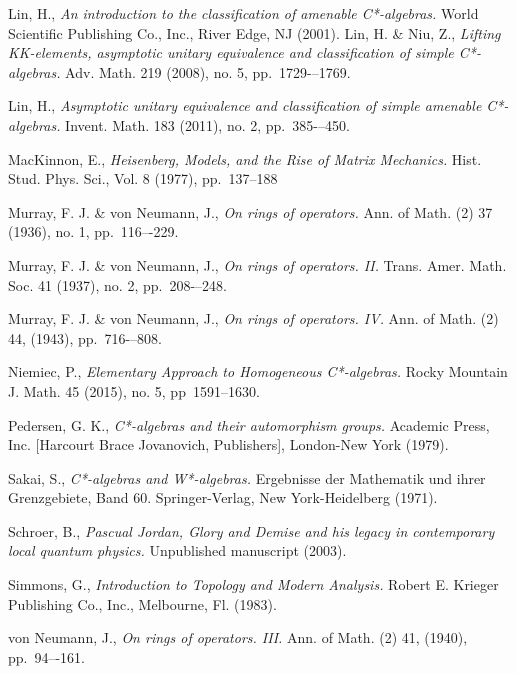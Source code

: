 \documentclass[12pt,a4paper]{amsart}
\theoremstyle{plain}
\theoremstyle{definition}
\begin{document}
\begin{thebibliography}{00}
	Lin, H.,
	\emph{An introduction to the classification of amenable C*-algebras.}
	World Scientific Publishing Co., Inc., River Edge, NJ (2001).
	Lin, H. \& Niu, Z.,
	\emph{Lifting KK-elements, asymptotic unitary equivalence and classification of simple C*-algebras.}
	Adv. Math. 219 (2008), no. 5, pp.~1729-–1769. 
	
	Lin, H.,
	\emph{Asymptotic unitary equivalence and classification of simple amenable C*-algebras.}
	Invent. Math. 183 (2011), no. 2, pp.~385-–450. 

	MacKinnon, E.,
	\emph{Heisenberg, Models, and the Rise of Matrix Mechanics.}
	Hist. Stud. Phys. Sci., Vol. 8 (1977), pp.~137--188
	
	Murray, F. J. \& von Neumann, J.,
	\emph{On rings of operators.}
	Ann. of Math. (2) 37 (1936), no. 1, pp.~116–-229.

	Murray, F. J. \& von Neumann, J.,
	\emph{On rings of operators. II.}
	Trans. Amer. Math. Soc. 41 (1937), no. 2, pp.~208-–248. 

	Murray, F. J. \& von Neumann, J.,
	\emph{On rings of operators. IV.}
	Ann. of Math. (2) 44, (1943), pp.~716-–808.
	
	Niemiec, P.,
	\emph{Elementary Approach to Homogeneous C*-algebras.}
	Rocky Mountain J. Math. 45 (2015), no. 5, pp~1591--1630.	
	
	Pedersen, G. K.,
	\emph{C*-algebras and their automorphism groups.}
	Academic Press, Inc. [Harcourt Brace Jovanovich, Publishers], London-New York (1979).

	Sakai, S.,
	\emph{C*-algebras and W*-algebras.}
	Ergebnisse der Mathematik und ihrer Grenzgebiete, Band 60. Springer-Verlag, New York-Heidelberg (1971).

	Schroer, B.,
	\emph{Pascual Jordan, Glory and Demise and his legacy in contemporary local quantum physics.}
	Unpublished manuscript (2003).
	
	Simmons, G.,
	\emph{Introduction to Topology and Modern Analysis.}
	Robert E. Krieger Publishing Co., Inc., Melbourne, Fl. (1983).

	von Neumann, J.,
	\emph{On rings of operators. III.}
	Ann. of Math. (2) 41, (1940), pp.~94–-161.

	
\end{thebibliography}
\end{document}
